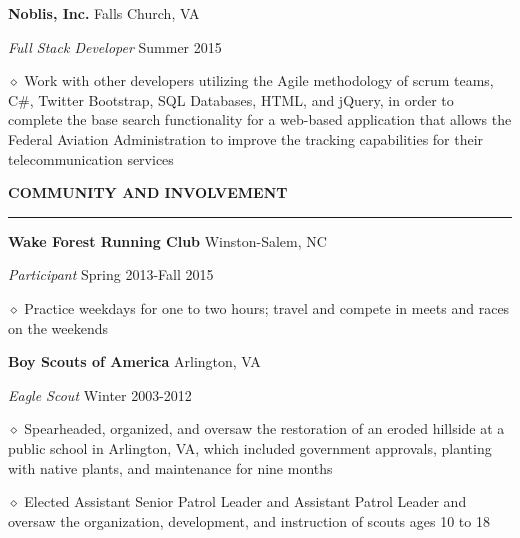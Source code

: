 \documentclass[executivepaper]{extarticle}
\begin{document}
\begin{center}
{\begin{minipage}{7.0in}
{\noindent \textbf{\fontsize{9}{8}\selectfont Noblis, Inc.}} {\hfill \fontsize{9}{8}\selectfont Falls Church, VA}

{\noindent \textit{\fontsize{9}{8}\selectfont Full Stack Developer}} {\hfill \fontsize{9}{8}\selectfont Summer 2015}

{\noindent $\diamond$ {\fontsize{9}{8}\selectfont Work with other developers utilizing the Agile methodology of scrum teams, C\#, Twitter Bootstrap, SQL Databases, HTML, and jQuery, in order to complete
the base search functionality for a web-based application that allows the Federal Aviation Administration to improve the tracking capabilities for their telecommunication services}}

\vspace{3mm}


{\noindent \textbf{\fontsize{10}{9}\selectfont COMMUNITY AND INVOLVEMENT}}

\vspace{-3mm}

\noindent \rule{\textwidth}{0.5pt}

\vspace{-1mm}

{\noindent \textbf{\fontsize{9}{8}\selectfont Wake Forest Running Club}} {\hfill \fontsize{9}{8}\selectfont Winston-Salem, NC}

{\noindent \textit{\fontsize{9}{8}\selectfont Participant}} {\hfill \fontsize{9}{8}\selectfont Spring 2013-Fall 2015}

{\noindent $\diamond$ {\fontsize{9}{8}\selectfont Practice weekdays for one to two hours; travel and compete in meets and races on the weekends}}

{\noindent \textbf{\fontsize{9}{8}\selectfont Boy Scouts of America}} {\hfill \fontsize{9}{8}\selectfont Arlington, VA}

{\noindent \textit{\fontsize{9}{8}\selectfont Eagle Scout}} {\hfill \fontsize{9}{8}\selectfont Winter 2003-2012}

{\noindent $\diamond$ {\fontsize{9}{8}\selectfont Spearheaded, organized, and oversaw the restoration of an eroded hillside at a public school in Arlington, VA, which included government
approvals, planting with native plants, and maintenance for nine months}}

{\noindent $\diamond$ {\fontsize{9}{8}\selectfont Elected Assistant Senior Patrol Leader and Assistant Patrol Leader and oversaw the organization, development, and instruction of scouts ages 10 to 18}}


\end{minipage}}
\end{center}
\end{document}
